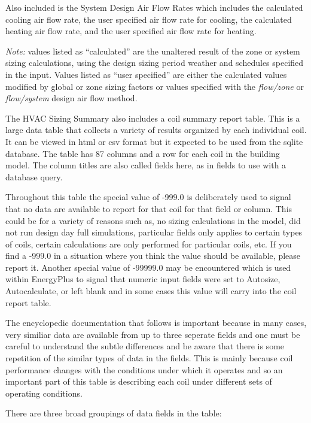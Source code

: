 Also included is the System Design Air Flow Rates which includes the calculated cooling air flow rate, the user specified air flow rate for cooling, the calculated heating air flow rate, and the user specified air flow rate for heating.

\emph{Note:} values listed as ``calculated'' are the unaltered result of the zone or system sizing calculations, using the design sizing period weather and schedules specified in the input. Values listed as ``user specified'' are either the calculated values modified by global or zone sizing factors or values specified with the \emph{flow/zone} or \emph{flow/system} design air flow method.

The HVAC Sizing Summary also includes a coil summary report table. This is a large data table that collects a variety of results organized by each individual coil.  It can be viewed in html or csv format but it expected to be used from the sqlite database.  The table has 87 columns and a row for each coil in the building model.  The column titles are also called fields here, as in fields to use with a database query. 

Throughout this table the special value of -999.0 is deliberately used to signal that no data are available to report for that coil for that field or column.  This could be for a variety of reasons such as, no sizing calculations in the model, did not run design day full simulations, particular fields only applies to certain types of coils, certain calculations are only performed for particular coils, etc.  If you find a -999.0 in a situation where you think the value should be available, please report it.  Another special value of -99999.0 may be encountered which is used within EnergyPlus to signal that numeric input fields were set to Autosize, Autocalculate, or left blank and in some cases this value will carry into the coil report table.

The encyclopedic documentation that follows is important because in many cases, very similiar data are available from up to three seperate fields and one must be careful to understand the subtle differences and be aware that there is some repetition of the similar types of data in the fields.  This is mainly because coil performance changes with the conditions under which it operates and so an important part of this table is describing each coil under different sets of operating conditions.

There are three broad groupings of data fields in the table:

